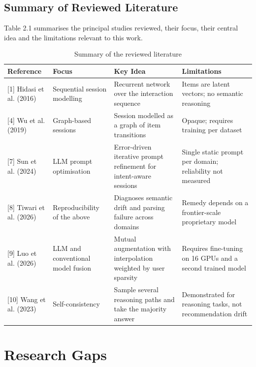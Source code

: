 \documentclass[12pt,a4paper,oneside]{report}
\begin{document}
\section{Summary of Reviewed Literature}

Table 2.1 summarises the principal studies reviewed, their focus, their central
idea and the limitations relevant to this work.

\begin{table}[h]
\centering
\small
\caption{Summary of the reviewed literature}
\begin{tabularx}{\textwidth}{@{}p{2.2cm}p{2.6cm}XX@{}}
\toprule
\textbf{Reference} & \textbf{Focus} & \textbf{Key Idea} & \textbf{Limitations}\\
\midrule
{[1]} Hidasi et al. (2016) & Sequential session modelling &
Recurrent network over the interaction sequence &
Items are latent vectors; no semantic reasoning\\[4pt]

{[4]} Wu et al. (2019) & Graph-based sessions &
Session modelled as a graph of item transitions &
Opaque; requires training per dataset\\[4pt]

{[7]} Sun et al. (2024) & LLM prompt optimisation &
Error-driven iterative prompt refinement for intent-aware sessions &
Single static prompt per domain; reliability not measured\\[4pt]

{[8]} Tiwari et al. (2026) & Reproducibility of the above &
Diagnoses semantic drift and parsing failure across domains &
Remedy depends on a frontier-scale proprietary model\\[4pt]

{[9]} Luo et al. (2026) & LLM and conventional model fusion &
Mutual augmentation with interpolation weighted by user sparsity &
Requires fine-tuning on 16 GPUs and a second trained model\\[4pt]

{[10]} Wang et al. (2023) & Self-consistency &
Sample several reasoning paths and take the majority answer &
Demonstrated for reasoning tasks, not recommendation drift\\
\bottomrule
\end{tabularx}
\end{table}

\chapter{Research Gaps}
\end{document}
